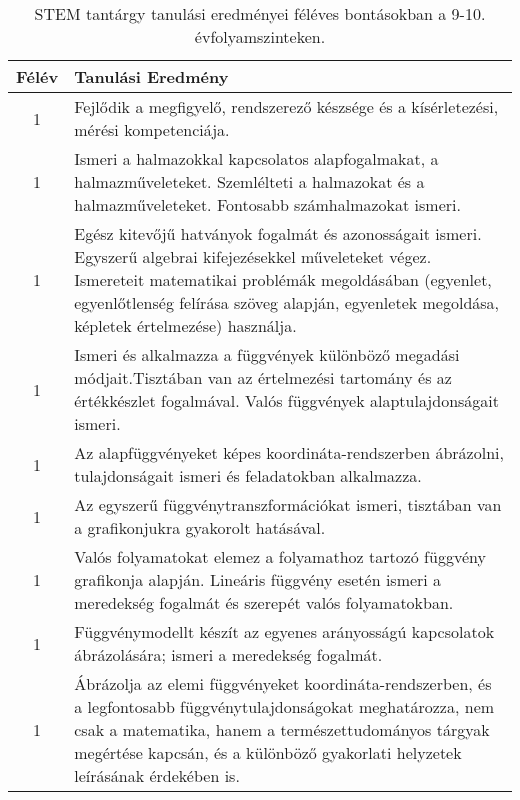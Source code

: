       
           \begin{longtable}{c | p{12cm} }
            \caption[STEM 9-10.]{STEM tantárgy tanulási eredményei féléves bontásokban a 9-10. évfolyamszinteken. }  \\

            \textbf{Félév} & \textbf{Tanulási Eredmény} \\
            \hline
            \endhead
                                
                                      
                                
                                          1 &  Fejlődik a megfigyelő, rendszerező készsége és a kísérletezési, mérési kompetenciája. \\ \hline
                                          1 &  Ismeri a halmazokkal kapcsolatos alapfogalmakat, a halmazműveleteket. Szemlélteti a halmazokat és a halmazműveleteket. Fontosabb számhalmazokat ismeri. \\ \hline
                                          1 &  Egész kitevőjű hatványok fogalmát és azonosságait ismeri. Egyszerű algebrai kifejezésekkel műveleteket végez. Ismereteit matematikai problémák megoldásában (egyenlet, egyenlőtlenség felírása szöveg alapján, egyenletek megoldása, képletek értelmezése) használja. \\ \hline
                                          1 &  Ismeri és alkalmazza a függvények különböző megadási módjait.Tisztában van az értelmezési tartomány és az értékkészlet fogalmával. Valós függvények alaptulajdonságait ismeri. \\ \hline
                                          1 &  Az alapfüggvényeket képes koordináta-rendszerben ábrázolni, tulajdonságait ismeri és feladatokban alkalmazza. \\ \hline
                                          1 &  Az egyszerű függvénytranszformációkat ismeri, tisztában van a grafikonjukra gyakorolt hatásával. \\ \hline
                                          1 &  Valós folyamatokat elemez a folyamathoz tartozó függvény grafikonja alapján. Lineáris függvény esetén ismeri a meredekség fogalmát és szerepét valós folyamatokban. \\ \hline
                                          1 &  Függvénymodellt készít az egyenes arányosságú kapcsolatok ábrázolására; ismeri a meredekség fogalmát. \\ \hline
                                          1 &  Ábrázolja az elemi függvényeket koordináta-rendszerben, és a legfontosabb függvénytulajdonságokat meghatározza, nem csak a matematika, hanem a természettudományos tárgyak megértése kapcsán, és a különböző gyakorlati helyzetek leírásának érdekében is. \\ \hline

\end{longtable}
